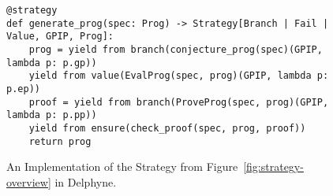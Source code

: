 \begin{figure}
\begin{lcodebox}
\begin{lstlisting}[style=delphyne]
@strategy
def generate_prog(spec: Prog) -> Strategy[Branch | Fail | Value, GPIP, Prog]:
    prog = yield from branch(conjecture_prog(spec)(GPIP, lambda p: p.gp))
    yield from value(EvalProg(spec, prog)(GPIP, lambda p: p.ep))
    proof = yield from branch(ProveProg(spec, prog)(GPIP, lambda p: p.pp))
    yield from ensure(check_proof(spec, prog, proof))
    return prog
\end{lstlisting}
\end{lcodebox}
\vspace{-0.2cm}
\caption{An Implementation of the  Strategy from Figure~\ref{fig:strategy-overview} in Delphyne.}\label{fig:delphyne-strategy-example}
\end{figure}
